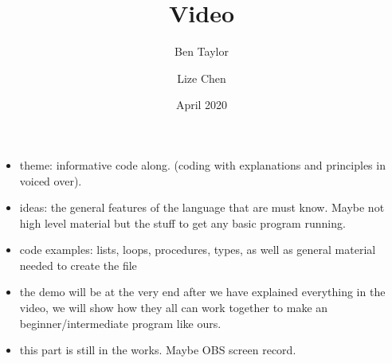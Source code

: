 \documentclass{article}
\title{Video}
\author{Ben Taylor 
\and 
Lize Chen}
\date{April 2020}
\begin{document}
\maketitle

\begin{itemize}
\item theme: informative code along. (coding with explanations and principles in voiced over).

\item ideas: the general features of the language that are must know. Maybe not high level material but the stuff to get any basic program running.

\item code examples: lists, loops, procedures, types, as well as general material needed to create the file 

\item the demo will be at the very end after we have explained everything in the video, 
we will show how they all can work together to make an beginner/intermediate program like ours.

\item this part is still in the works. Maybe OBS screen record.

\end{itemize}
\end{document}
